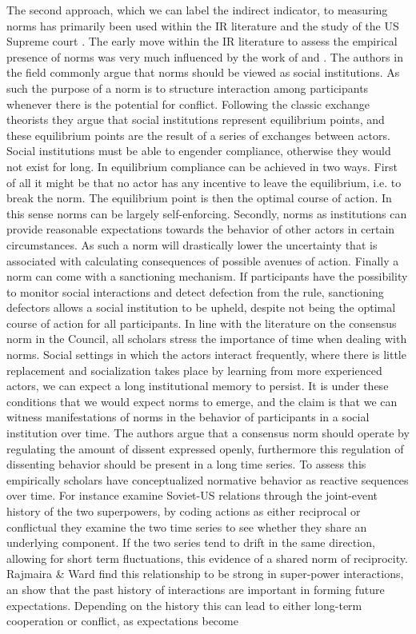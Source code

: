 The second approach, which we can label the indirect indicator, to measuring norms has primarily been used within the IR literature \citep{RajmairaWard1990,RajmairaWard1992, Goldstein1991,Rajmaira1997} and the study of the US Supreme court \citep{CalderiaZorn1998}. The early move within the IR literature to assess the empirical presence of norms was very much influenced by the work of \citet{Keohane1986} and \citet{Axelrod1986}. The authors in the field commonly argue that norms should be viewed as social institutions. As such the purpose of a norm is to structure interaction among participants whenever there is the potential for conflict. Following the classic exchange theorists they argue that social institutions represent equilibrium points, and these equilibrium points are the result of a series of exchanges between actors. Social institutions must be able to engender compliance, otherwise they would not exist for long. In equilibrium compliance can be achieved in two ways. First of all it might be that no actor has any incentive to leave the equilibrium, i.e. to break the norm. The equilibrium point is then the optimal course of action. In this sense norms can be largely self-enforcing. Secondly, norms as institutions can provide reasonable expectations towards the behavior of other actors in certain circumstances. As such a norm will drastically lower the uncertainty that is associated with calculating consequences of possible avenues of action. Finally a norm can come with a sanctioning mechanism. If participants have the possibility to monitor social interactions and detect defection from the rule, sanctioning defectors allows a social institution to be upheld, despite not being the optimal course of action for all participants. In line with the literature on the consensus norm in the Council, all scholars stress the importance of time when dealing with norms. Social settings in which the actors interact frequently, where there is little replacement and socialization takes place by learning from more experienced actors, we can expect a long institutional memory to persist. It is under these conditions that we would expect norms to emerge, and the claim is that we can witness manifestations of norms in the behavior of participants in a social institution over time. The authors argue that a consensus norm should operate by regulating the amount of dissent expressed openly, furthermore this regulation of dissenting behavior should be present in a long time series. To assess this empirically scholars have conceptualized normative behavior as reactive sequences over time. For instance \citep{RajmairaWard1990,RajmairaWard1992} examine Soviet-US relations through the joint-event history of the two superpowers, by coding actions as either reciprocal or conflictual they examine the two time series to see whether they share an underlying component. If the two series tend to drift in the same direction, allowing for short term fluctuations, this evidence of a shared norm of reciprocity. Rajmaira \& Ward find this relationship to be strong in super-power interactions, an show that the past history of interactions are important in forming future expectations. Depending on the history this can lead to either long-term cooperation or conflict, as expectations become 